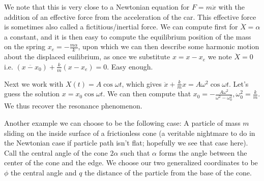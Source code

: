 \documentclass[10pt]{report}
\begin{document}
We note that this is very close to a Newtonian equation for $F=m\ddot{x}$ with the addition of an effective force from the acceleration of the car. This effective force is sometimes also called a fictitious/inertial force. We can compute first for $\ddot{X}=\alpha$ a constant, and it is then easy to compute the equilibrium position of the mass on the spring $x_e=-\frac{m\alpha}{k}$, upon which we can then describe some harmonic motion about the displaced euilibrium, as once we substitute $x=x-x_e$ we note $\ddot{X}=0$ i.e. $(\ddot{x-x_0}) + \frac{k}{m}(x-x_e) = 0$. Easy enough.

Next we work with $X(t)=A\cos\omega t$, which gives $\ddot{x}+\frac{k}{m}x = A\omega^2\cos\omega t$. Let's guess the solution $x=x_0\cos\omega t$. We can then compute that $x_0=-\frac{A\omega^2}{\omega^2-\omega_0^2}, \omega_0^2=\frac{k}{m}$. We thus recover the resonance phenomenon. 

Another example we can choose to be the following case: A particle of mass $m$ sliding on the inside surface of a frictionless cone (a veritable nightmare to do in the Newtonian case if particle path isn't flat; hopefully we see that case here). Call the central angle of the cone $2\alpha$ such that $\alpha$ forms the angle between the center of the cone and the edge. We choose our two generalized coordinates to be $\phi$ the central angle and $q$ the distance of the particle from the base of the cone. 
\end{document}
